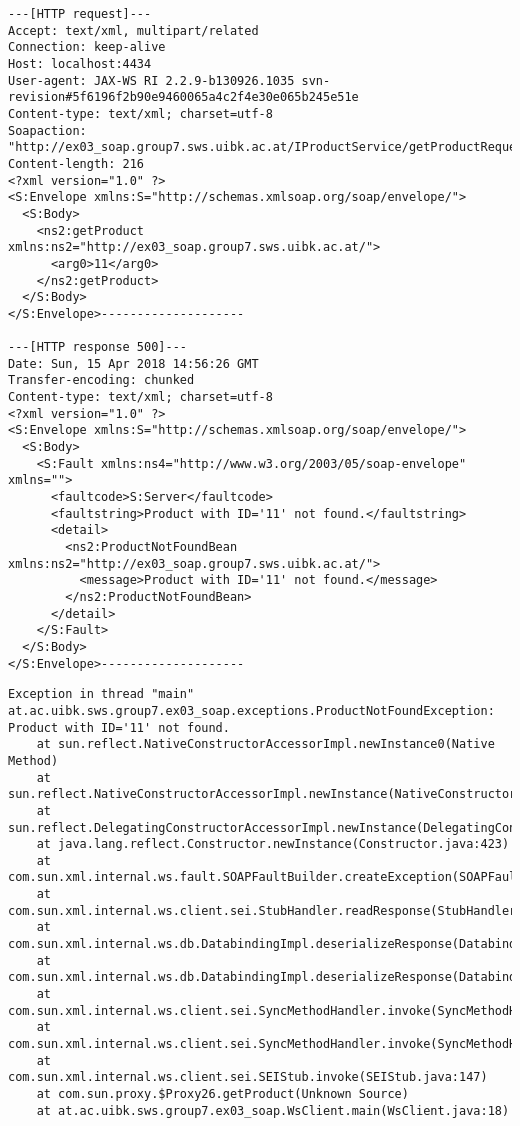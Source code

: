 \documentclass[a4paper]{article}
\begin{document}
\begin{lstlisting}[caption=Request \& Response for SOAP Fault in \emph{getProduct()}]
---[HTTP request]---
Accept: text/xml, multipart/related
Connection: keep-alive
Host: localhost:4434
User-agent: JAX-WS RI 2.2.9-b130926.1035 svn-revision#5f6196f2b90e9460065a4c2f4e30e065b245e51e
Content-type: text/xml; charset=utf-8
Soapaction: "http://ex03_soap.group7.sws.uibk.ac.at/IProductService/getProductRequest"
Content-length: 216
<?xml version="1.0" ?>
<S:Envelope xmlns:S="http://schemas.xmlsoap.org/soap/envelope/">
  <S:Body>
    <ns2:getProduct xmlns:ns2="http://ex03_soap.group7.sws.uibk.ac.at/">
      <arg0>11</arg0>
    </ns2:getProduct>
  </S:Body>
</S:Envelope>--------------------

---[HTTP response 500]---
Date: Sun, 15 Apr 2018 14:56:26 GMT
Transfer-encoding: chunked
Content-type: text/xml; charset=utf-8
<?xml version="1.0" ?>
<S:Envelope xmlns:S="http://schemas.xmlsoap.org/soap/envelope/">
  <S:Body>
    <S:Fault xmlns:ns4="http://www.w3.org/2003/05/soap-envelope" xmlns="">
      <faultcode>S:Server</faultcode>
      <faultstring>Product with ID='11' not found.</faultstring>
      <detail>
        <ns2:ProductNotFoundBean xmlns:ns2="http://ex03_soap.group7.sws.uibk.ac.at/">
          <message>Product with ID='11' not found.</message>
        </ns2:ProductNotFoundBean>
      </detail>
    </S:Fault>
  </S:Body>
</S:Envelope>--------------------
\end{lstlisting}

\begin{lstlisting}[caption=SOAP Fault as user-defined \emph{ProductNotFoundException}]
Exception in thread "main" at.ac.uibk.sws.group7.ex03_soap.exceptions.ProductNotFoundException: Product with ID='11' not found.
	at sun.reflect.NativeConstructorAccessorImpl.newInstance0(Native Method)
	at sun.reflect.NativeConstructorAccessorImpl.newInstance(NativeConstructorAccessorImpl.java:62)
	at sun.reflect.DelegatingConstructorAccessorImpl.newInstance(DelegatingConstructorAccessorImpl.java:45)
	at java.lang.reflect.Constructor.newInstance(Constructor.java:423)
	at com.sun.xml.internal.ws.fault.SOAPFaultBuilder.createException(SOAPFaultBuilder.java:135)
	at com.sun.xml.internal.ws.client.sei.StubHandler.readResponse(StubHandler.java:238)
	at com.sun.xml.internal.ws.db.DatabindingImpl.deserializeResponse(DatabindingImpl.java:189)
	at com.sun.xml.internal.ws.db.DatabindingImpl.deserializeResponse(DatabindingImpl.java:276)
	at com.sun.xml.internal.ws.client.sei.SyncMethodHandler.invoke(SyncMethodHandler.java:104)
	at com.sun.xml.internal.ws.client.sei.SyncMethodHandler.invoke(SyncMethodHandler.java:77)
	at com.sun.xml.internal.ws.client.sei.SEIStub.invoke(SEIStub.java:147)
	at com.sun.proxy.$Proxy26.getProduct(Unknown Source)
	at at.ac.uibk.sws.group7.ex03_soap.WsClient.main(WsClient.java:18)
\end{lstlisting}
\end{document}
